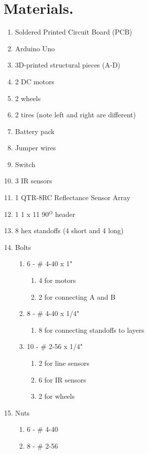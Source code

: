 \documentclass{handout}
\begin{document}
	\section{Materials.}
	\begin{enumerate}
		\item Soldered Printed Circuit Board (PCB)
		\item Arduino Uno
		\item 3D-printed structural pieces (A-D)
		\item 2 DC motors
		\item 2 wheels
		\item 2 tires (note left and right are different)
		\item Battery pack
		\item Jumper wires
		\item Switch
		\item 3 IR sensors
		\item 1 QTR-8RC Reflectance Sensor Array
		\item 1 1 x 11 90$^O$ header
		\item 8 hex standoffs (4 short and 4 long)
		\item Bolts
		\begin{enumerate}
			\item 6 - \# 4-40 x 1"
			\begin{enumerate}
				\item 4 for motors
				\item 2 for connecting A and B
			\end{enumerate}
			\item 8 - \# 4-40 x 1/4"
			\begin{enumerate}
				\item 8 for connecting standoffs to layers
			\end{enumerate}
			\item 10 - \# 2-56 x 1/4"
			\begin{enumerate}
				\item 2 for line sensors
				\item 6 for IR sensors
				\item 2 for wheels
			\end{enumerate}
		\end{enumerate}
		\item Nuts
		\begin{enumerate}
			\item 6 - \# 4-40
			\item 8 - \# 2-56
		\end{enumerate}
	\end{enumerate}
	\newpage
\clearpage
\pagebreak
	
\end{document}
